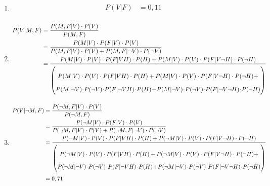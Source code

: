 \documentclass[a4paper,10pt,fleqn]{article}
\begin{document}
\begin{enumerate}[1.]
    \item
        \begin{align*}
            P(V| F) & = 0,11 \\
        \end{align*}


    \item
        \begin{align*}
            P(V |M, F)
                & = \frac{P(M,F|V)\cdot P(V)}{P(M,F)} \\
                & = \frac{P(M|V)\cdot P(F|V)\cdot P(V)}{P(M,F|V)\cdot P(V) + P(M,F|\lnot V)\cdot P(\lnot V)} \\
                & = \frac{
                        P(M|V)\cdot P(V) \cdot P(F|VH)\cdot P(H) + P(M|V)\cdot P(V)\cdot P(F|V\lnot H)\cdot P(\lnot H)
                    }{
                      \left(
                            \parbox{12cm}{
                    $$P(M|V)\cdot P(V) \cdot P(F|VH)\cdot P(H) + P(M|V)\cdot P(V)\cdot P(F|V\lnot H)\cdot P(\lnot H) + $$
                           $$ P(M|\lnot V)\cdot P(\lnot V)\cdot P(F|\lnot VH)\cdot P(H) + P(M|\lnot V)\cdot P(\lnot V)\cdot P(F|\lnot V\lnot H)\cdot P(\lnot H) $$
                     } \right)
                    } \\
       \end{align*}

    \item
        \begin{align*}
            P(V |\lnot M, F)
                & = \frac{P(\lnot M,F|V)\cdot P(V)}{P(\lnot M,F)} \\
                & = \frac{P(\lnot M|V)\cdot P(F|V)\cdot P(V)}{P(\lnot M,F|V)\cdot P(V) + P(\lnot M,F|\lnot V)\cdot P(\lnot V)} \\
                & = \frac{
                        P(\lnot M|V)\cdot P(V) \cdot P(F|VH)\cdot P(H) + P(\lnot M|V)\cdot P(V)\cdot P(F|V\lnot H)\cdot P(\lnot H)
                    }{
                      \left(
                            \parbox{12.5cm}{
                    $$P(\lnot M|V)\cdot P(V) \cdot P(F|VH)\cdot P(H) + P(\lnot M|V)\cdot P(V)\cdot P(F|V\lnot H)\cdot P(\lnot H) + $$
                           $$ P(\lnot M|\lnot V)\cdot P(\lnot V)\cdot P(F|\lnot VH)\cdot P(H) + P(\lnot M|\lnot V)\cdot P(\lnot V)\cdot P(F|\lnot V\lnot H)\cdot P(\lnot H) $$
                     } \right)
                    } \\
                    & = 0,71
        \end{align*}


\end{enumerate}
\end{document}
